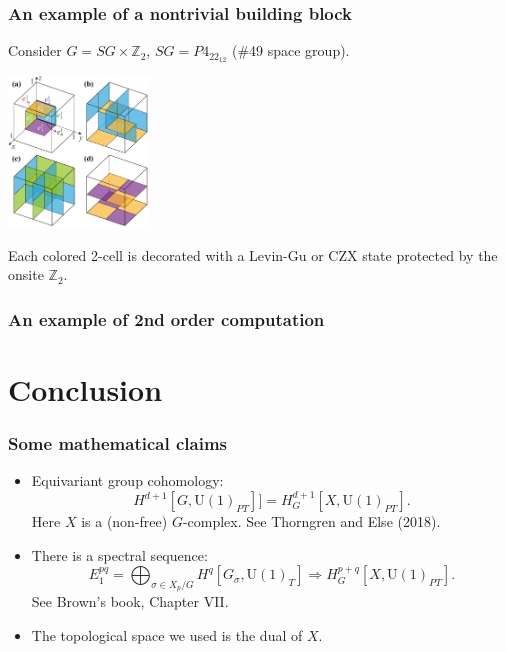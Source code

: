 \documentclass[xcolor=table, 10pt, aspectratio=43]{beamer}
\newcommand{\uone}{\mathrm U(1)}
\begin{document}
\begin{frame}
\frametitle{An example of a nontrivial building block}
Consider $G=SG\times\mathbb Z_2$, $SG=P4_22_12$ (\#49 space group).
\begin{center}
\includegraphics[height=4cm]{blocks}
\end{center}
Each colored 2-cell is decorated with a Levin-Gu or CZX state protected by the onsite $\mathbb Z_2$.
\end{frame}

\begin{frame}
\frametitle{An example of 2nd order computation}
\end{frame}

\section{Conclusion}

\begin{frame}
\frametitle{Some mathematical claims}
\begin{itemize}
\item Equivariant group cohomology:
\[H^{d+1}[G, \uone_{PT}]]=H^{d+1}_G[X, \uone_{PT}].\]
Here $X$ is a (non-free) $G$-complex. See Thorngren and Else (2018).
\item There is a spectral sequence:
\[E_1^{pq}=\bigoplus_{\sigma\in X_p/G}H^q[G_\sigma,\uone_T]\Rightarrow
H^{p+q}_G[X,\uone_{PT}].\]
See Brown's book, Chapter VII.
\item The topological space we used is the dual of $X$.
\end{itemize}
\end{frame}
\end{document}
